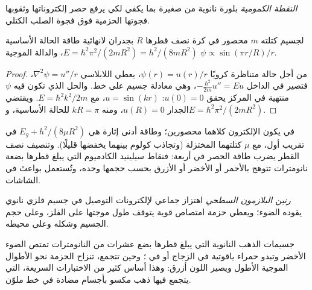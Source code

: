 \begin{definition}\label{def:b3:inorganic-materials:quantum-dot}
\emph{النقطة الكمومية} بلورة نانوية من  صغيرة
بما يكفي لكي يرفع حصر إلكتروناتها وثقوبها فجوتها الحزمية
فوق فجوة الصلب الكتلي.
\end{definition}

\begin{theorem}\label{thm:b3:inorganic-materials:quantum-dot}
لجسيم كتلته $m$ محصور في كرة نصف قطرها $R$ بجدران لانهائية
طاقة الحالة الأساسية $E = \hbar^2\pi^2/(2mR^2) = h^2/(8mR^2)$، والدالة الموجية $\psi \propto \sin(\pi r/R)/r$.
\end{theorem}

\begin{proof}
من أجل حالة متناظرة كرويًا $\psi(r) = u(r)/r$، يعطي اللابلاسي
$\nabla^2\psi = u''/r$، فتصير  في الداخل $-\frac{\hbar^2}{2m}u'' = Eu$، وهي معادلة جسيم على
خط. والحل الذي تكون فيه $\psi$ منتهية في المركز يحقق $u(0) = 0$: $u = \sin(kr)$، مع $E = \hbar^2k^2/2m$.
ويقتضي الجدار $u(R) = 0$، ومنه $kR = \pi$ للحالة الأساسية، و$E = \hbar^2\pi^2/(2mR^2)$.
\end{proof}

في  يكون الإلكترون  كلاهما محصورين؛ وطاقة
أدنى إثارة هي $E_g + h^2/(8\mu R^2)$ في تقريب أول، مع $\mu$ كتلتهما
المختزلة (وتجاذب كولوم بينهما يخفضها قليلًا). وتنصيف نصف القطر
يضرب طاقة الحصر في أربعة: فنقاط سيلينيد الكادميوم التي يبلغ قطرها بضعة
نانومترات تتوهج بالأحمر أو الأخضر أو الأزرق بحسب حجمها وحده، وتُستعمل
بواعثَ في الشاشات.

\begin{definition}\label{def:b3:inorganic-materials:plasmon}
\emph{رنين البلازمون السطحي}
اهتزاز جماعي لإلكترونات التوصيل في جسيم فلزي نانوي
يقوده الضوء؛ ويعطي حزمة امتصاص قوية يتوقف طول موجتها على
الفلز، وعلى حجم الجسيم وشكله وعلى محيطه.
\end{definition}

جسيمات الذهب النانوية التي يبلغ قطرها بضع عشرات من النانومترات تمتص الضوء الأخضر وتبدو
حمراء ياقوتية في الزجاج أو في ؛ وحين تتجمع، تنزاح الحزمة نحو
الأطوال الموجية الأطول ويصير اللون أزرق: وهذا أساس كثير من الاختبارات السريعة، التي
يتجمع فيها  ذهب مكسو بأجسام مضادة في خط ملوّن.

